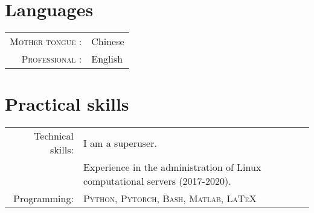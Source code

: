 \documentclass[a4paper,10pt]{article}
\begin{document}
\begin{bibunit}
  \renewcommand\refname{Recent Publications (See more at \href{https://scholar.google.com/citations?hl=en&user=eK9LoQMAAAAJ&view_op=list_works&sortby=pubdate}{my Scholar})}
  \nocite{
    liu2020region,
    liu2020alpha,
    zuxing2020cdc,
    anubhad2020,
    andrea2020,
    liu2020powering,
    honore2020hidden,
    liu2020neural,
    chatterjee2019ssfn,
    liu2019discontinuous,
    liu2019entropy,
    liu2019alpha,
    liu2019dominant,
    liu2018will}

  \footnotesize{\putbib[../bibfile]}
\end{bibunit}

\vspace{-10pt}

\section{Languages}

\begin{tabular}{rp{10cm}}

  \textsc{Mother tongue :} & Chinese \\

  \textsc{Professional :} & English \\

\end{tabular}


\section{Practical skills}

\begin{tabular}{rp{12cm}}
	Technical skills:  & I am a superuser. \\
                     & Experience in the administration of Linux computational servers (2017-2020).
                       \vspace{5pt}\\
	Programming:       & \textsc{Python, Pytorch, Bash, Matlab, \LaTeX}  \vspace{5pt}\\
\end{tabular}
\end{document}
